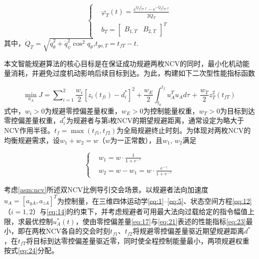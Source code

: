 \begin{equation}
\label{eq:22}
\left\{
\begin{aligned}
& {\varphi _T}(t) = \frac{{{e^{{{\dot Q}_T}{t_{go,T}}}} - {e^{ - {{\dot Q}_T}{t_{go,T}}}}}}{{2{{\dot Q}_T}}} \\
& {b_T} = {\left[ {\begin{array}{*{20}{c}}
  {{B_{1,T}}}&{{B_{2,T}}}
\end{array}} \right]^T}
\end{aligned}
\right.
\end{equation}
其中，${\dot Q_T} = \sqrt {\dot q_\theta ^2 + \dot q_\psi ^2{{\cos }^2}{q_\theta }} $,${t_{go,T}} = {t_{fT}} - t$.

本文智能规避算法的核心目标是在保证成功规避两枚NCV的同时，最小化机动能量消耗，并避免过度机动影响后续目标到达。为此，构建如下二次型性能指标函数

\begin{equation}
\label{eq:23}
\mathop {\min }\limits_{{u_A}} J = \sum\nolimits_{i = 1}^2 {\frac{{{w_i}}}{2}{{\left[ {z_i\left( {{t_{fi}}} \right) - d_i^*} \right]}^2}}  + \frac{{{w_E}}}{2}\int_{{t_0}}^{{t_f}} {u_A^T{u_A}d\tau {\text{ + }}\frac{{{w_T}}}{2}z_T^2\left( {{t_{fT}}} \right)}
\end{equation}
式中，${w_i} > 0$为规避零控偏差量权重，${w_E} > 0$为控制能量权重，${w_T} > 0$为目标到达零控偏差量权重，$d_i^*$为规避者与第i枚NCV的期望规避距离，通常设定为略大于NCV作用半径。${t_f} = \max ({t_{f1}},{t_{f2}})$为全局规避终止时刻。为体现对两枚NCV的均衡规避需求，设${w_1} + {w_2} = w$（$w$为一正常数），且${w_1}$, ${w_2}$满足

\begin{equation}
\label{eq:24}
\left\{
\begin{aligned}
& {w_1} = w \cdot \frac{1}{{1 + {e^{ - \gamma }}}} \\
& {w_2} = w - {w_1} = w \cdot \frac{{{e^{ - \gamma }}}}{{1 + {e^{ - \gamma }}}}
\end{aligned}
\right.
\end{equation}
\begin{problem}[一体化最优规避与制导]
\label{prb:integrated}
考虑\cref{asm:ncv}所述双NCV比例导引交会场景。以规避者法向加速度${u_A} = {[{a_{yA}},{a_{zA}}]^T}$为控制量，在三维四体运动学\eqref{eq:1}--\eqref{eq:5}、状态空间方程\eqref{eq:12}（$i = 1,2$）与\eqref{eq:14}的约束下，并考虑规避者可用最大法向过载给定的指令幅值上限，求最优控制$u_A^*(t)$，使由零控偏差量\eqref{eq:17}与\eqref{eq:21}表述的性能指标\eqref{eq:23}最小，即在两枚NCV各自的交会时刻${t_{f1}}$、${t_{f2}}$将规避零控偏差量驱近期望规避距离$d^*$，在${t_{fT}}$将目标到达零控偏差量驱近零，同时使全程控制能量最小，两项规避权重按式\eqref{eq:24}分配。
\end{problem}

